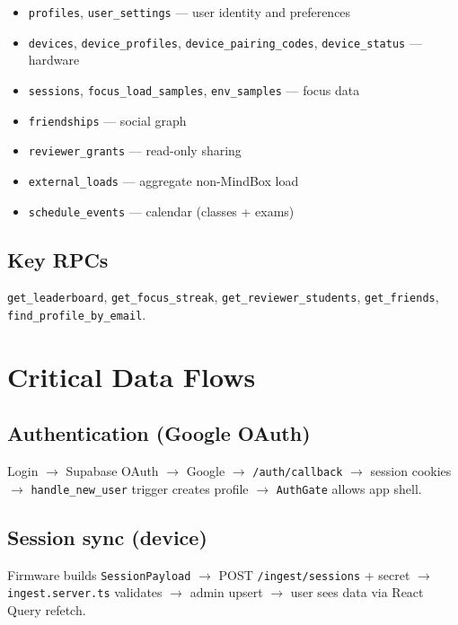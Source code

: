 \documentclass[11pt,a4paper]{article}
\newcommand{\filepath}[1]{\texttt{#1}}
\begin{document}
\begin{itemize}[leftmargin=*]
  \item \texttt{profiles}, \texttt{user\_settings} --- user identity and preferences
  \item \texttt{devices}, \texttt{device\_profiles}, \texttt{device\_pairing\_codes}, \texttt{device\_status} --- hardware
  \item \texttt{sessions}, \texttt{focus\_load\_samples}, \texttt{env\_samples} --- focus data
  \item \texttt{friendships} --- social graph
  \item \texttt{reviewer\_grants} --- read-only sharing
  \item \texttt{external\_loads} --- aggregate non-MindBox load
  \item \texttt{schedule\_events} --- calendar (classes + exams)
\end{itemize}

\subsection{Key RPCs}

\texttt{get\_leaderboard}, \texttt{get\_focus\_streak}, \texttt{get\_reviewer\_students},
\texttt{get\_friends}, \texttt{find\_profile\_by\_email}.

\section{Critical Data Flows}

\subsection{Authentication (Google OAuth)}

Login $\rightarrow$ Supabase OAuth $\rightarrow$ Google $\rightarrow$ \filepath{/auth/callback}
$\rightarrow$ session cookies $\rightarrow$ \texttt{handle\_new\_user} trigger creates profile
$\rightarrow$ \texttt{AuthGate} allows app shell.

\subsection{Session sync (device)}

Firmware builds \texttt{SessionPayload} $\rightarrow$ POST \filepath{/ingest/sessions} +
secret $\rightarrow$ \filepath{ingest.server.ts} validates $\rightarrow$ admin upsert
$\rightarrow$ user sees data via React Query refetch.
\end{document}
